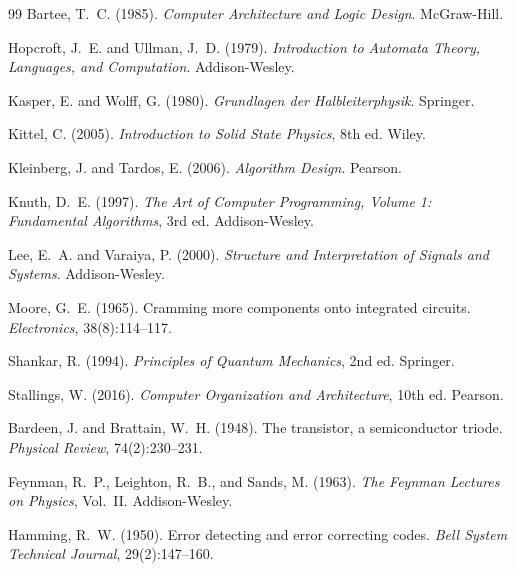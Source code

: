 \documentclass[12pt, a4paper]{article}
\theoremstyle{definition}
\theoremstyle{remark}
\begin{document}
\begin{thebibliography}{99}
Bartee, T.~C. (1985).
\newblock \textit{Computer Architecture and Logic Design}.
\newblock McGraw-Hill.

Hopcroft, J.~E. and Ullman, J.~D. (1979).
\newblock \textit{Introduction to Automata Theory, Languages, and Computation}.
\newblock Addison-Wesley.

Kasper, E. and Wolff, G. (1980).
\newblock \textit{Grundlagen der Halbleiterphysik}.
\newblock Springer.

Kittel, C. (2005).
\newblock \textit{Introduction to Solid State Physics}, 8th ed.
\newblock Wiley.

Kleinberg, J. and Tardos, E. (2006).
\newblock \textit{Algorithm Design}.
\newblock Pearson.

Knuth, D.~E. (1997).
\newblock \textit{The Art of Computer Programming, Volume 1: Fundamental Algorithms}, 3rd ed.
\newblock Addison-Wesley.

Lee, E.~A. and Varaiya, P. (2000).
\newblock \textit{Structure and Interpretation of Signals and Systems}.
\newblock Addison-Wesley.

Moore, G.~E. (1965).
\newblock Cramming more components onto integrated circuits.
\newblock \textit{Electronics}, 38(8):114--117.

Shankar, R. (1994).
\newblock \textit{Principles of Quantum Mechanics}, 2nd ed.
\newblock Springer.

Stallings, W. (2016).
\newblock \textit{Computer Organization and Architecture}, 10th ed.
\newblock Pearson.

Bardeen, J. and Brattain, W.~H. (1948).
\newblock The transistor, a semiconductor triode.
\newblock \textit{Physical Review}, 74(2):230--231.

Feynman, R.~P., Leighton, R.~B., and Sands, M. (1963).
\newblock \textit{The Feynman Lectures on Physics}, Vol.~II.
\newblock Addison-Wesley.

Hamming, R.~W. (1950).
\newblock Error detecting and error correcting codes.
\newblock \textit{Bell System Technical Journal}, 29(2):147--160.


\end{thebibliography}
\end{document}

